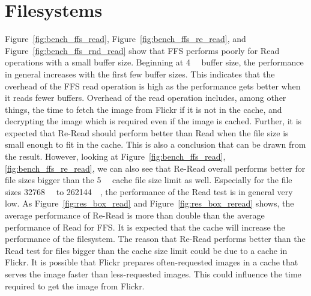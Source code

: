 \section{Filesystems}
\label{sec:dis_fs}
Figure~\ref{fig:bench_ffs_read}, Figure~\ref{fig:bench_ffs_re_read}, and Figure~\ref{fig:bench_ffs_rnd_read} show that \gls{FFS} performs poorly for Read operations with a small buffer size. Beginning at \SI{4}{\kilo\byte} buffer size, the performance in general increases with the first few buffer sizes. This indicates that the overhead of the \gls{FFS} read operation is high as the performance gets better when it reads fewer buffers. Overhead of the read operation includes, among other things, the time to fetch the image from Flickr if it is not in the cache, and decrypting the image which is required even if the image is cached. Further, it is expected that \mbox{Re-Read} should perform better than Read when the file size is small enough to fit in the cache. This is also a conclusion that can be drawn from the result. However, looking at Figure~\ref{fig:bench_ffs_read}, \ref{fig:bench_ffs_re_read}, we can also see that \mbox{Re-Read} overall performs better for file sizes bigger than the \SI{5}{\mega\byte} cache file size limit as well. Especially for the file sizes \SI{32768}{\kilo\byte} to \SI{262144}{\kilo\byte}, the performance of the Read test is in general very low. As Figure~\ref{fig:res_box_read} and Figure~\ref{fig:res_box_reread} shows, the average performance of \mbox{Re-Read} is more than double than the average performance of Read for \gls{FFS}. It is expected that the cache will increase the performance of the filesystem. The reason that \mbox{Re-Read} performs better than the Read test for files bigger than the cache size limit could be due to a cache in Flickr. It is possible that Flickr prepares often-requested images in a cache that serves the image faster than less-requested images. This could influence the time required to get the image from Flickr. 

